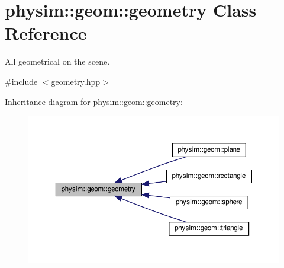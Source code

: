 \hypertarget{classphysim_1_1geom_1_1geometry}{}\section{physim\+:\+:geom\+:\+:geometry Class Reference}
\label{classphysim_1_1geom_1_1geometry}


All geometrical on the scene.  




{\ttfamily \#include $<$geometry.\+hpp$>$}



Inheritance diagram for physim\+:\+:geom\+:\+:geometry\+:\nopagebreak
\begin{figure}[H]
\begin{center}
\leavevmode
\includegraphics[width=350pt]{classphysim_1_1geom_1_1geometry__inherit__graph}
\end{center}
\end{figure}
